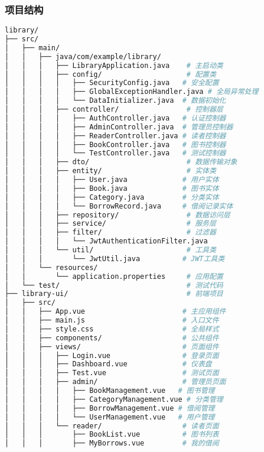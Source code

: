 \documentclass[12pt,a4paper]{article}
\begin{document}
\subsubsection{项目结构}
\begin{lstlisting}[language=bash]
library/
├── src/
│   ├── main/
│   │   ├── java/com/example/library/
│   │   │   ├── LibraryApplication.java    # 主启动类
│   │   │   ├── config/                    # 配置类
│   │   │   │   ├── SecurityConfig.java   # 安全配置
│   │   │   │   ├── GlobalExceptionHandler.java # 全局异常处理
│   │   │   │   └── DataInitializer.java  # 数据初始化
│   │   │   ├── controller/                # 控制器层
│   │   │   │   ├── AuthController.java   # 认证控制器
│   │   │   │   ├── AdminController.java  # 管理员控制器
│   │   │   │   ├── ReaderController.java # 读者控制器
│   │   │   │   ├── BookController.java   # 图书控制器
│   │   │   │   └── TestController.java   # 测试控制器
│   │   │   ├── dto/                       # 数据传输对象
│   │   │   ├── entity/                    # 实体类
│   │   │   │   ├── User.java             # 用户实体
│   │   │   │   ├── Book.java             # 图书实体
│   │   │   │   ├── Category.java         # 分类实体
│   │   │   │   └── BorrowRecord.java     # 借阅记录实体
│   │   │   ├── repository/                # 数据访问层
│   │   │   ├── service/                   # 服务层
│   │   │   ├── filter/                    # 过滤器
│   │   │   │   └── JwtAuthenticationFilter.java
│   │   │   └── util/                      # 工具类
│   │   │       └── JwtUtil.java          # JWT工具类
│   │   └── resources/
│   │       └── application.properties     # 应用配置
│   └── test/                              # 测试代码
├── library-ui/                            # 前端项目
│   ├── src/
│   │   ├── App.vue                       # 主应用组件
│   │   ├── main.js                       # 入口文件
│   │   ├── style.css                     # 全局样式
│   │   ├── components/                   # 公共组件
│   │   ├── views/                        # 页面组件
│   │   │   ├── Login.vue                 # 登录页面
│   │   │   ├── Dashboard.vue             # 仪表盘
│   │   │   ├── Test.vue                  # 测试页面
│   │   │   ├── admin/                    # 管理员页面
│   │   │   │   ├── BookManagement.vue   # 图书管理
│   │   │   │   ├── CategoryManagement.vue # 分类管理
│   │   │   │   ├── BorrowManagement.vue # 借阅管理
│   │   │   │   └── UserManagement.vue   # 用户管理
│   │   │   └── reader/                   # 读者页面
│   │   │       ├── BookList.vue          # 图书列表
│   │   │       ├── MyBorrows.vue         # 我的借阅

\end{lstlisting}
\end{document}
